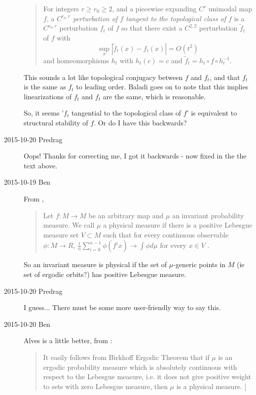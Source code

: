 \begin{description}
\begin{quote}
For  integers $r \ge r_0 \ge 2$, and a piecewise expanding $C^{r}$ unimodal map
$f$, a {\it $C^{r_0,r}$ perturbation of $f$ tangent to the topological class of $f$}
is a $C^{r_0, r}$ perturbation $f_t$ of $f$ so that
there exist a $C^{2,2}$ perturbation
$\tilde f_t$ of $f$  with
$$\sup_x|\tilde f_t(x)-f_t(x)|=O(t^2)$$
and
homeomorphisms $h_t$  with $h_t(c)=c$ and
$\tilde f_t=h_t \circ f \circ h_t^{-1}$.
\end{quote}


This sounds a lot like topological conjugacy between $f$ and $f^{~}_{t}$,
and that $f^{~}_{t}$ is the same as $f_{t}$ to leading order. Baladi goes
on to note that this implies linearizations of $f_{t}$ and $f^{~}_{t}$
are the same, which is reasonable.

So, it seems '$f_{t}$ tangential to the topological class of $f$' is
equivalent to structural stability of $f$. Or do I have this backwards?

\item[2015-10-20 Predrag] Oops! Thanks for correcting me, I got it
backwards - now fixed in the the text above.

\item[2015-10-19 Ben]
From ,

\begin{quote}
Let $f : M \to M$ be an arbitrary map and $\mu$ an invariant probability
measure. We call $\mu$ a physical measure if there is a positive Lebesgue
measure set $V \subset M$ such that for every continuous observable $\phi
: M \to R$, $\frac{1}{n}\sum^{n-1}_{i=0} \phi(f^{i}x) \rightarrow \int
\phi d\mu$ for every $x \in V$ .
\end{quote}

So an invariant measure is physical if the set of $\mu$-generic points in
$M$ (ie set of ergodic orbits?) has positive Lebesgue measure.

\item[2015-10-20 Predrag] I guess... There must be some more
user-friendly way to say this.

\item[2015-10-20 Ben]
{Alves} is a little better, from :
\begin{quote}
It easily follows from Birkhoff Ergodic Theorem that if
$\mu$ is an ergodic probability measure which is absolutely
continuous with respect to the Lebesgue measure, i.e. it
does not give positive weight to sets with zero Lebesgue
measure, then $\mu$ is a physical measure. ]
\end{quote}


\end{description}
